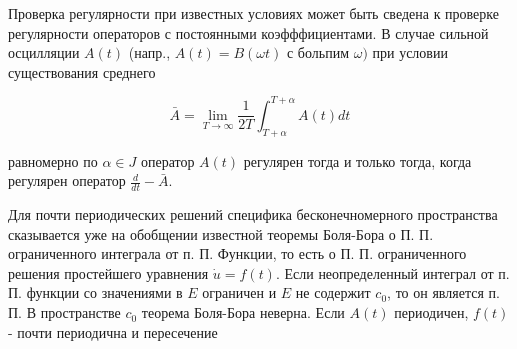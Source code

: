 \documentclass[10pt]{article}
\begin{document}
Проверка регулярности при известных условиях может быть сведена к проверке регулярности операторов с постоянными коэфффициентами. В случае сильной осцилляции $A(t)$ (напр., $A(t)=B(\omega t)$ с больпим $\omega)$ при условии существования среднего



\[

\bar{A}=\lim _{T \rightarrow \infty} \frac{1}{2 T} \int_{T+\alpha}^{T+\alpha} A(t) d t

\]



равномерно по $\alpha \in J$ оператор $A(t)$ регулярен тогда и только тогда, когда регулярен оператор $\frac{d}{d t}-\bar{A}$.



Для почти периодических решений специфика бесконечномерного пространства сказывается уже на обобщении известной теоремы Боля-Бора о П. П. ограниченного интеграла от п. П. Функции, то есть о П. П. ограниченного решения простейшего уравнения $\dot{u}=f(t)$. Если неопределенный интеграл от п. П. функции со значениями в $E$ ограничен и $E$ не содержит $c_{0}$, то он является п. П. В пространстве $c_{0}$ теорема Боля-Бора неверна. Если $A(t)$ периодичен, $f(t)$ - почти периодична и пересечение
\end{document}

